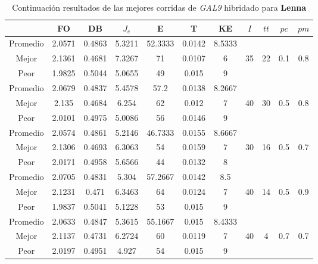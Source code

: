 \begin{table}[h!]
    \footnotesize
    \begin{center}
        \begin{tabular}{|c|c|c|c|c|c|c|c|c|c|c|}
        \hline
             & {\bf FO} & {\bf DB} & $J_e$ & {\bf E} & {\bf T} & {\bf KE} & $I$ & $tt$ & $pc$ & $pm$ \\
        \hline
        \hline
            Promedio  & 2.0571 & 0.4863 & 5.3211 & 52.3333 & 0.0142 & 8.5333 &  &  &  & \\
            \cline{1-7}
            Mejor & 2.1361 & 0.4681  & 7.3267 & 71 & 0.0107 & 6 & 35 & 22 & 0.1 & 0.8\\
            \cline{1-7}
            Peor & 1.9825 & 0.5044  & 5.0655 & 49 & 0.015 & 9 &  &  &  & \\
        \hline
        \hline
            Promedio  & 2.0679 & 0.4837 & 5.4578 & 57.2 & 0.0138 & 8.2667 &  &  &  & \\
            \cline{1-7}
            Mejor & 2.135 & 0.4684  & 6.254 & 62 & 0.012 & 7 & 40 & 30 & 0.5 & 0.8\\
            \cline{1-7}
            Peor & 2.0101 & 0.4975  & 5.0086 & 56 & 0.0146 & 9 &  &  &  & \\
        \hline
        \hline
            Promedio  & 2.0574 & 0.4861 & 5.2146 & 46.7333 & 0.0155 & 8.6667 &  &  &  & \\
            \cline{1-7}
            Mejor & 2.1306 & 0.4693  & 6.3063 & 54 & 0.0159 & 7 & 30 & 16 & 0.5 & 0.7\\
            \cline{1-7}
            Peor & 2.0171 & 0.4958  & 5.6566 & 44 & 0.0132 & 8 &  &  &  & \\
        \hline
        \hline
            Promedio  & 2.0705 & 0.4831 & 5.304 & 57.2667 & 0.0142 & 8.5 &  &  &  & \\
            \cline{1-7}
            Mejor & 2.1231 & 0.471  & 6.3463 & 64 & 0.0124 & 7 & 40 & 14 & 0.5 & 0.9\\
            \cline{1-7}
            Peor & 1.9837 & 0.5041  & 5.1228 & 53 & 0.015 & 9 &  &  &  & \\
        \hline
        \hline
            Promedio  & 2.0633 & 0.4847 & 5.3615 & 55.1667 & 0.015 & 8.4333 &  &  &  & \\
            \cline{1-7}
            Mejor & 2.1137 & 0.4731  & 6.2724 & 60 & 0.0119 & 7 & 40 & 4 & 0.7 & 0.7\\
            \cline{1-7}
            Peor & 2.0197 & 0.4951  & 4.927 & 54 & 0.015 & 9 &  &  &  & \\
        \hline
        \end{tabular}
        \caption{Continuaci\'on resultados de las mejores corridas de \emph{GAL9} hibridado para {\bf Lenna}}
        \label{tb:tablecGAL9}
    \end{center}
\end{table}
